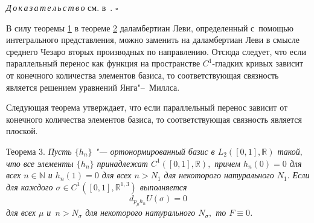 \textit{Д\,о\,к\,а\,з\,а\,т\,е\,л\,ь\,с\,т\,в\,о\/} см. в~\cite{volkov:bib:AGV}. $\square$

\smallskip

В силу теоремы \hyperlink{volk:th1}{1} в теореме \hyperlink{volk:th2}{2} даламбертиан Леви, определенный с~помощью интегрального представления, можно заменить на  даламбертиан Леви в смысле среднего Чезаро вторых производных по направлению.
Отсюда следует, что если параллельный перенос как функция на пространстве $C^1$-гладких кривых зависит от конечного количества элементов базиса, то соответствующая связность является решением уравнений Янга"--~Миллса. 

Следующая теорема утверждает, что если  параллельный перенос  зависит от конечного количества элементов базиса, то соответствующая связность является плоской.


\smallskip


\hypertarget{volk:th3}{}


{\small\sc Теорема 3.} {\it
Пусть $\{h_n\}$ "--- ортонормированный базис в $L_2([0, 1],\mathbb{R})$ такой$,$ что все элементы $\{h_n\}$ принадлежат $C^1([0,  1],\mathbb{R}),$ причем  $h_n(0)=0$ для всех $n\in \mathbb{N}$ и  $h_n(1)=0$ для всех $n>N_1$ для некоторого натурального $N_1.$ 
 Если для каждого $\sigma\in C^1([0, 1],\mathbb{R}^{1, 3})$ выполняется
 \begin{equation}
 \label{volk:condition}
 d_{p_\mu h_n}U(\sigma)=0
 \end{equation}
 для всех $\mu$ и~$n>N_\sigma$ для некоторого натурального $N_\sigma,$ то  $F\equiv0$.
}

\smallskip


